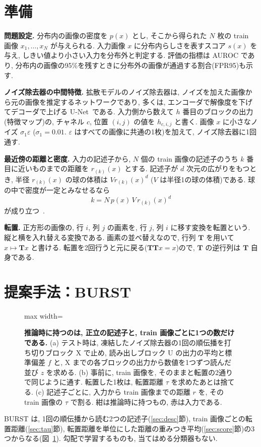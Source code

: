 \documentclass[MIRU,submit]{miru2025j}
\makeatletter
\newcommand{\Tm}{\mathbf{T}}            %
\newcommand{\method}{BURST}                 %
\renewenvironment{figure*}{\@floatenv\capwidth\textwidth\ecapwidth\textwidth\abovecaptionskip1mm\belowcaptionskip\z@\@dblfloat{figure}}{\end@dblfloat}
\makeatother
\begin{document}
\section{準備}
\label{sec:prep}
\textbf{問題設定.} 分布内の画像の密度を $p(x)$ とし, そこから得られた $N$ 枚の train 画像 $x_1,\ldots,x_N$ が与えられる. 入力画像 $x$ に分布内らしさを表すスコア $s(x)$ を与え, しきい値より小さい入力を分布外と判定する. 評価の指標は AUROC であり, 分布内の画像の95\%を残すときに分布外の画像が通過する割合(FPR95)も示す.

\textbf{ノイズ除去器の中間特徴.} 拡散モデルのノイズ除去器は, ノイズを加えた画像から元の画像を推定するネットワークであり, 多くは, エンコーダで解像度を下げてデコーダで上げる U-Net~\cite{ronneberger2015unet}である. 入力側から数えて $h$ 番目のブロックの出力(特徴マップ)の, チャネル $c$, 位置 $(i,j)$ の値を $h_{c,i,j}$ と書く. 画像 $x$ に小さなノイズ $\sigma_1\varepsilon$ ($\sigma_1=0.01$. $\varepsilon$ はすべての画像に共通の1枚)を加えて, ノイズ除去器に1回通す.

\textbf{最近傍の距離と密度.} 入力の記述子から, $N$ 個の train 画像の記述子のうち $k$ 番目に近いものまでの距離を $r_{(k)}(x)$ とする. 記述子が $d$ 次元の広がりをもつとき, 半径 $r_{(k)}(x)$ の球の体積は $V r_{(k)}(x)^{d}$ ($V$ は半径1の球の体積)である. 球の中で密度が一定とみなせるなら
\begin{equation}
k=N\,p(x)\,V\,r_{(k)}(x)^{d}
\label{eq:knn}
\end{equation}
が成り立つ~\cite{loftsgaarden1965knn}.

\textbf{転置.} 正方形の画像の, 行 $i$, 列 $j$ の画素を, 行 $j$, 列 $i$ に移す変換を転置という. 縦と横を入れ替える変換である. 画素の並べ替えなので, 行列 $\Tm$ を用いて $x\mapsto\Tm x$ と書ける. 転置を2回行うと元に戻る($\Tm\Tm x=x$)ので, $\Tm$ の逆行列は $\Tm$ 自身である.

\section{提案手法：\method}
\label{sec:method}
\begin{figure}[t]\centering
\begin{adjustbox}{max width=\textwidth}\end{adjustbox}
\caption{\textbf{推論時に持つのは, 正立の記述子と, train 画像ごとに1つの数だけである.} (a) テスト時は, 凍結したノイズ除去器の1回の順伝播を打ち切りブロック X で止め, 読み出しブロック U の出力の平均と標準偏差 $f$ と, X までの各ブロックの出力から数値を1つずつ読んだ並び $z$ を求める. (b) 事前に, train 画像を, そのままと転置の2通りで同じように通す. 転置した1枚は, 転置距離 $\tau$ を求めたあとは捨てる. (c) 記述子ごとに, 入力から train 画像までの距離 $r$ を, その train 画像の $\tau$ で割る. 紺は推論時に持つもの, 赤は入力である.}
\label{fig:method}
\end{figure}
\method{} は, 1回の順伝播から読む2つの記述子(\ref{sec:desc}節), train 画像ごとの転置距離(\ref{sec:tau}節), 転置距離を単位にした距離の重みつき平均(\ref{sec:score}節)の3つからなる(図~\ref{fig:method}). 勾配で学習するものも, 当てはめる分類器もない.
\end{document}
